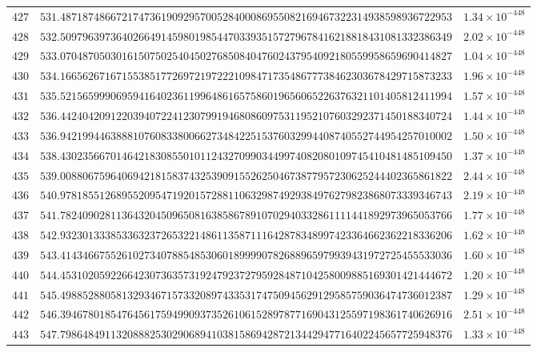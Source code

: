 \documentclass[12pt,reqno]{amsart}
\theoremstyle{remark}
\begin{document}
\begin{longtable}{clc}
$427$ & $531.4871874866721747361909295700528400086955082169467322314938598936722953$ & $1.34\times 10^{-448}$ \\
$428$ & $532.5097963973640266491459801985447033935157279678416218818431081332386349$ & $2.02\times 10^{-448}$ \\
$429$ & $533.0704870503016150750254045027685084047602437954092180559958659690414827$ & $1.04\times 10^{-448}$ \\
$430$ & $534.1665626716715538517726972197222109847173548677738462303678429715873233$ & $1.96\times 10^{-448}$ \\
$431$ & $535.5215659990695941640236119964861657586019656065226376321101405812411994$ & $1.57\times 10^{-448}$ \\
$432$ & $536.4424042091220394072241230799194680860975311952107603292371450188340724$ & $1.44\times 10^{-448}$ \\
$433$ & $536.9421994463888107608338006627348422515376032994408740552744954257010002$ & $1.50\times 10^{-448}$ \\
$434$ & $538.4302356670146421830855010112432709903449974082080109745410481485109450$ & $1.37\times 10^{-448}$ \\
$435$ & $539.0088067596406942181583743253909155262504673877957230625244402365861822$ & $2.44\times 10^{-448}$ \\
$436$ & $540.9781855126895520954719201572881106329874929384976279823868073339346743$ & $2.19\times 10^{-448}$ \\
$437$ & $541.7824090281136432045096508163858678910702940332861111441892973965053766$ & $1.77\times 10^{-448}$ \\
$438$ & $542.9323013338533632372653221486113587111642878348997423364662362218336206$ & $1.62\times 10^{-448}$ \\
$439$ & $543.4143466755261027340788548530601899990782688965979939431972725455533036$ & $1.60\times 10^{-448}$ \\
$440$ & $544.4531020592266423073635731924792372795928487104258009885169301421444672$ & $1.20\times 10^{-448}$ \\
$441$ & $545.4988528805813293467157332089743353174750945629129585759036474736012387$ & $1.29\times 10^{-448}$ \\
$442$ & $546.3946780185476456175949909373526106152897877169043125597198361740626916$ & $2.51\times 10^{-448}$ \\
$443$ & $547.7986484911320888253029068941038158694287213442947716402245657725948376$ & $1.33\times 10^{-448}$ \\

\end{longtable}
\end{document}
